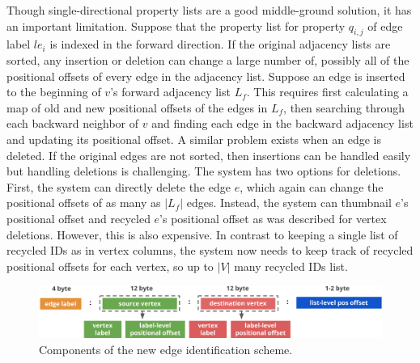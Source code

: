  Though single-directional property lists are a good middle-ground solution, it has an important limitation. Suppose that the property list for property $q_{i,j}$ of edge label $le_i$ is indexed in the forward direction. If the original adjacency lists are sorted,  any insertion or deletion can change a large number of, possibly all of the positional offsets of every edge in the adjacency list. Suppose an edge is inserted to the beginning of $v$'s forward adjacency list $L_f$. This requires first calculating a map of old and new positional offsets of the edges in $L_f$, then searching through each backward neighbor of $v$ and finding each edge in the backward adjacency list and updating its positional offset. A similar problem exists when an edge is deleted. If the original edges are not sorted, then insertions can be handled easily but handling deletions is challenging. The system has two options for deletions. First, the system can directly delete the edge $e$, which again can change the positional offsets of as many as $|L_f|$ edges. Instead, the system can thumbnail $e$'s positional offset and recycled $e$'s positional offset as was described for vertex deletions. However, this is also expensive. In contrast to keeping a single list of recycled IDs as in vertex columns, the system now needs to keep track of recycled positional offsets for each vertex, so up to $|V|$ many recycled IDs list.

\begin{figure}
	\hfill\includegraphics[scale=0.78]{img/edge-scheme}\hspace*{\fill}
	\captionsetup{justification=centering}
	\caption{Components of the new edge identification scheme.}
	\label{fig:edge-scheme}
\end{figure}

